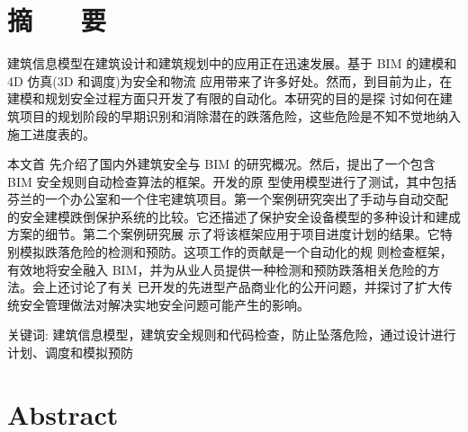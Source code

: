 \section*{ \centering 摘 ~~ 要}

\vskip0.5cm
建筑信息模型在建筑设计和建筑规划中的应用正在迅速发展。基于 BIM 的建模和 4D 仿真(3D 和调度)为安全和物流
应用带来了许多好处。然而，到目前为止，在建模和规划安全过程方面只开发了有限的自动化。本研究的目的是探
讨如何在建筑项目的规划阶段的早期识别和消除潜在的跌落危险，这些危险是不知不觉地纳入施工进度表的。

本文首
先介绍了国内外建筑安全与 BIM 的研究概况。然后，提出了一个包含 BIM 安全规则自动检查算法的框架。开发的原
型使用模型进行了测试，其中包括芬兰的一个办公室和一个住宅建筑项目。第一个案例研究突出了手动与自动交配
的安全建模跌倒保护系统的比较。它还描述了保护安全设备模型的多种设计和建成方案的细节。第二个案例研究展
示了将该框架应用于项目进度计划的结果。它特别模拟跌落危险的检测和预防。这项工作的贡献是一个自动化的规
则检查框架，有效地将安全融入 BIM，并为从业人员提供一种检测和预防跌落相关危险的方法。会上还讨论了有关
已开发的先进型产品商业化的公开问题，并探讨了扩大传统安全管理做法对解决实地安全问题可能产生的影响。


{ \heiti 关键词: } 建筑信息模型，建筑安全规则和代码检查，防止坠落危险，通过设计进行计划、调度和模拟预防

\clearpage
\section*{ \centering \textbf{Abstract} }

